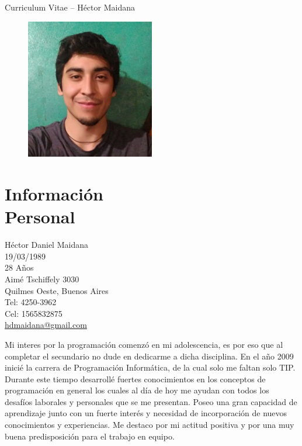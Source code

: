 \documentclass[margin, line, a4paper]{resume}
\begin{document}
  
  {\sc \Large Curriculum Vitae -- Héctor Maidana}

  \begin{resume}
    \vspace{0.5cm}
    \begin{figure}
      \vspace{-1cm}
      \begin{center}
        \includegraphics[width=0.5\textwidth]{photo}
      \end{center}
    \end{figure}

    \section{\mysidestyle Información\\Personal}
      Héctor Daniel Maidana \\
      19/03/1989 \\
      28 Años \\
      Aimé Tschiffely 3030 \\ 
      Quilmes Oeste, Buenos Aires \\ 
      Tel: 4250-3962 \\
      Cel: 1565832875 \\
      \href{mailto:hdmaidana@gmail.com}{hdmaidana@gmail.com}
      
      Mi interes por la programación comenzó en mi adolescencia, es por eso que al completar el secundario no dude en dedicarme a dicha disciplina. En el año 2009 inicié la carrera de Programación Informática, de la cual solo me faltan solo TIP. Durante este tiempo desarrollé fuertes conocimientos en los conceptos de programación en general los cuales al día de hoy me ayudan con todos los desafíos laborales y personales que se me presentan.  Poseo una gran capacidad de aprendizaje junto con un fuerte interés y necesidad de incorporación de nuevos conocimientos y experiencias. Me destaco por mi actitud positiva y por una muy buena predisposición para el trabajo en equipo.


\end{resume}
\end{document}
